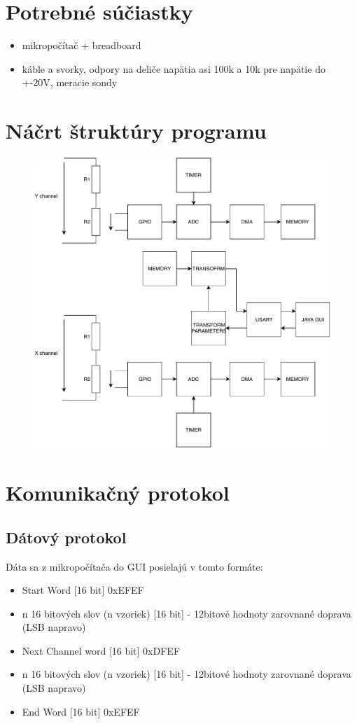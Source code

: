 \documentclass{article}
\begin{document}
	\section{Potrebné súčiastky}
		\begin{itemize}
		\item mikropočítač + breadboard
		\item káble a svorky, odpory na deliče napätia asi 100k a 10k pre napätie do +-20V, meracie sondy
	\end{itemize}
	\section{Náčrt štruktúry programu}
	
	\begin{figure}[h!]
		\centering
		\includegraphics[width=\linewidth]{../Obrazky/basicstructure.pdf}
	\end{figure}


	\pagebreak
	\section{Komunikačný protokol}
	\subsection{Dátový protokol}
	Dáta sa z mikropočítača do GUI posielajú v tomto formáte:
		\begin{itemize}
			\item Start Word [16 bit]	0xEFEF
			\item n 16 bitových slov (n vzoriek) [16 bit] - 12bitové hodnoty zarovnané doprava (LSB napravo)
			\item Next Channel word [16 bit] 0xDFEF
			\item n 16 bitových slov (n vzoriek) [16 bit] - 12bitové hodnoty zarovnané doprava (LSB napravo)
			\item End Word [16 bit] 0xEFEF
		\end{itemize}
		
\end{document}
